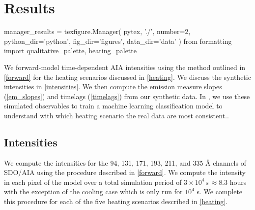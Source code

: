 \section{Results}\label{results}

\begin{pycode}
manager_results = texfigure.Manager(
    pytex,
    './',
    number=2,
    python_dir='python',
    fig_dir='figures',
    data_dir='data'
)
from formatting import qualitative_palette, heating_palette
\end{pycode}

We forward-model time-dependent AIA intensities using the method outlined in \autoref{forward} for the heating scenarios discussed in \autoref{heating}. We discuss the synthetic intensities in \autoref{intensities}. We then compute the emission measure slopes (\autoref{em_slopes}) and timelags (\autoref{timelags}) from our synthetic data. In , we use these simulated observables to train a machine learning classification model to understand with which heating scenario the real data are most consistent..

\subsection{Intensities}\label{intensities}

We compute the intensities for the 94, 131, 171, 193, 211, and 335 \AA{} channels of SDO/AIA using the procedure described in \autoref{forward}. We compute the intensity in each pixel of the model \AR{} over a total simulation period of $3\times10^4\,\mathrm{s}\,\approx8.3$ hours with the exception of the cooling case which is only run for $10^4$ s. We complete this procedure for each of the five heating scenarios described in \autoref{heating}.

